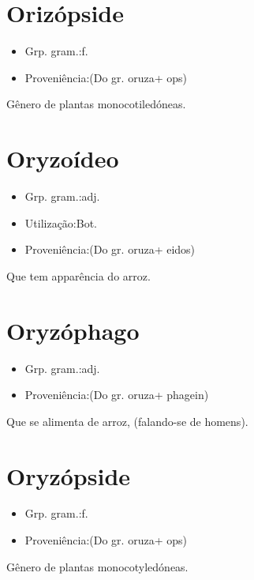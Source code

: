 \section{Orizópside}
\begin{itemize}
\item {Grp. gram.:f.}
\end{itemize}
\begin{itemize}
\item {Proveniência:(Do gr. \textunderscore oruza\textunderscore  + \textunderscore ops\textunderscore )}
\end{itemize}
Gênero de plantas monocotiledóneas.
\section{Oryzoídeo}
\begin{itemize}
\item {Grp. gram.:adj.}
\end{itemize}
\begin{itemize}
\item {Utilização:Bot.}
\end{itemize}
\begin{itemize}
\item {Proveniência:(Do gr. \textunderscore oruza\textunderscore  + \textunderscore eidos\textunderscore )}
\end{itemize}
Que tem apparência do arroz.
\section{Oryzóphago}
\begin{itemize}
\item {Grp. gram.:adj.}
\end{itemize}
\begin{itemize}
\item {Proveniência:(Do gr. \textunderscore oruza\textunderscore  + \textunderscore phagein\textunderscore )}
\end{itemize}
Que se alimenta de arroz, (falando-se de homens).
\section{Oryzópside}
\begin{itemize}
\item {Grp. gram.:f.}
\end{itemize}
\begin{itemize}
\item {Proveniência:(Do gr. \textunderscore oruza\textunderscore  + \textunderscore ops\textunderscore )}
\end{itemize}
Gênero de plantas monocotyledóneas.
